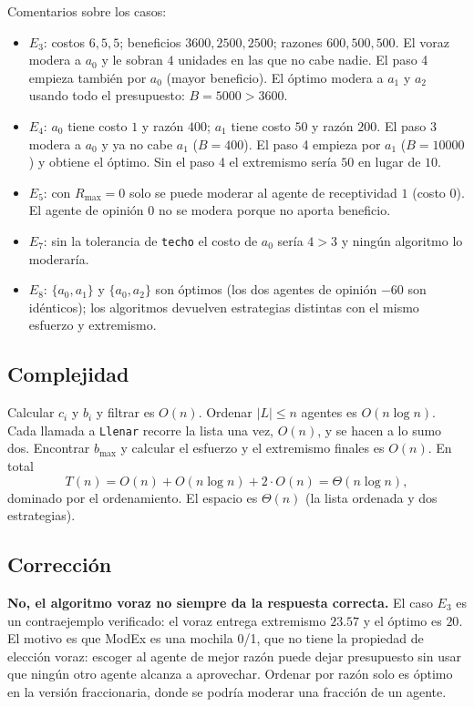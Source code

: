 \documentclass[11pt,letterpaper]{article}
\newcommand{\Rmax}{R_{\max}}
\begin{document}
Comentarios sobre los casos:
\begin{itemize}
  \item $E_3$: costos $6, 5, 5$; beneficios $3600, 2500, 2500$; razones
        $600, 500, 500$. El voraz modera a $a_0$ y le sobran $4$ unidades en
        las que no cabe nadie. El paso 4 empieza también por $a_0$ (mayor
        beneficio). El óptimo modera a $a_1$ y $a_2$ usando todo el
        presupuesto: $B = 5000 > 3600$.
  \item $E_4$: $a_0$ tiene costo $1$ y razón $400$; $a_1$ tiene costo $50$ y
        razón $200$. El paso 3 modera a $a_0$ y ya no cabe $a_1$
        ($B = 400$). El paso 4 empieza por $a_1$ ($B = 10000$) y obtiene el
        óptimo. Sin el paso 4 el extremismo sería $50$ en lugar de $10$.
  \item $E_5$: con $\Rmax = 0$ solo se puede moderar al agente de
        receptividad $1$ (costo $0$). El agente de opinión $0$ no se modera
        porque no aporta beneficio.
  \item $E_7$: sin la tolerancia de \texttt{techo} el costo de $a_0$ sería
        $4 > 3$ y ningún algoritmo lo moderaría.
  \item $E_8$: $\{a_0,a_1\}$ y $\{a_0,a_2\}$ son óptimos (los dos agentes de
        opinión $-60$ son idénticos); los algoritmos devuelven estrategias
        distintas con el mismo esfuerzo y extremismo.
\end{itemize}

\subsection{Complejidad}

Calcular $c_i$ y $b_i$ y filtrar es $O(n)$. Ordenar $|L| \le n$ agentes es
$O(n \log n)$. Cada llamada a \texttt{Llenar} recorre la lista una vez,
$O(n)$, y se hacen a lo sumo dos. Encontrar $b_{\max}$ y calcular el esfuerzo
y el extremismo finales es $O(n)$. En total
\[
  T(n) = O(n) + O(n\log n) + 2\cdot O(n) = \Theta(n \log n),
\]
dominado por el ordenamiento. El espacio es $\Theta(n)$ (la lista ordenada y
dos estrategias).

\subsection{Corrección}
\label{sec:voraz-correccion}

\textbf{No, el algoritmo voraz no siempre da la respuesta correcta.} El caso
$E_3$ es un contraejemplo verificado: el voraz entrega extremismo $23.57$ y el
óptimo es $20$. El motivo es que ModEx es una mochila 0/1, que no tiene la
propiedad de elección voraz: escoger al agente de mejor razón puede dejar
presupuesto sin usar que ningún otro agente alcanza a aprovechar. Ordenar por
razón solo es óptimo en la versión fraccionaria, donde se podría moderar una
fracción de un agente.
\end{document}
